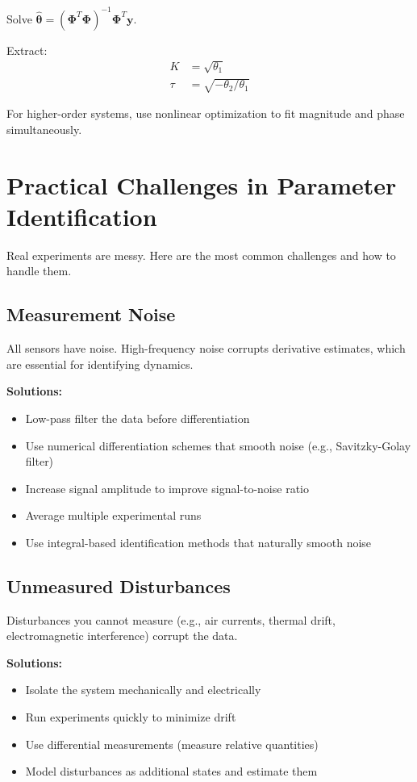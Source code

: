 Solve $\hat{\boldsymbol{\theta}} = (\mathbf{\Phi}^T\mathbf{\Phi})^{-1}\mathbf{\Phi}^T\mathbf{y}$.

Extract:
\begin{align}
K &= \sqrt{\theta_1} \\
\tau &= \sqrt{-\theta_2/\theta_1}
\end{align}

For higher-order systems, use nonlinear optimization to fit magnitude and phase simultaneously.

\section{Practical Challenges in Parameter Identification}

Real experiments are messy. Here are the most common challenges and how to handle them.

\subsection{Measurement Noise}

All sensors have noise. High-frequency noise corrupts derivative estimates, which are essential for identifying dynamics.

\textbf{Solutions:}
\begin{itemize}
    \item Low-pass filter the data before differentiation
    \item Use numerical differentiation schemes that smooth noise (e.g., Savitzky-Golay filter)
    \item Increase signal amplitude to improve signal-to-noise ratio
    \item Average multiple experimental runs
    \item Use integral-based identification methods that naturally smooth noise
\end{itemize}

\subsection{Unmeasured Disturbances}

Disturbances you cannot measure (e.g., air currents, thermal drift, electromagnetic interference) corrupt the data.

\textbf{Solutions:}
\begin{itemize}
    \item Isolate the system mechanically and electrically
    \item Run experiments quickly to minimize drift
    \item Use differential measurements (measure relative quantities)
    \item Model disturbances as additional states and estimate them
\end{itemize}

